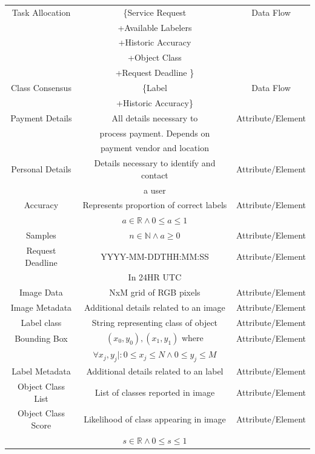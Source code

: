 \documentclass[12pt]{article}
\begin{document}
\begin{center}
  \begin{tabular}{ |c|c|c| } %
    \hline
    Task Allocation &  \{Service Request & Data Flow \\ 
    &  +Available Labelers & \\
    &  +Historic Accuracy & \\
    &  +Object Class & \\
    &  +Request Deadline \} & \\
    \hline
    Class Consensus &  \{Label & Data Flow \\ 
    &  +Historic Accuracy\} & \\
    \hline
    Payment Details & All details necessary to   & Attribute/Element \\ 
    & process payment. Depends on &\\
    & payment vendor and location  &  \\ 
    \hline
    Personal Details & Details necessary to identify and contact & Attribute/Element \\
    &    a user  &  \\
    \hline
    Accuracy & Represents proportion of correct labels & Attribute/Element \\
    & $a \in \mathbb{R} \wedge 0 \leq a \leq 1$ & \\
    \hline
    Samples & $n \in \mathbb{N} \wedge a \geq 0 $ & Attribute/Element \\
    \hline
    Request Deadline & YYYY-MM-DDTHH:MM:SS & Attribute/Element \\
    & In 24HR UTC &  \\
    \hline
    Image Data & NxM grid of RGB pixels & Attribute/Element \\
    \hline
    Image Metadata & Additional details related to an image& Attribute/Element \\
    \hline
    Label class & String representing class of object& Attribute/Element \\
    \hline
    Bounding Box & $(x_0,y_0),(x_1,y_1)$ where  & Attribute/Element \\
    & $\forall x_j,y_j |: 0 \leq x_j \leq N \wedge 0 \leq y_j \leq M $   &  \\
    \hline
    Label Metadata & Additional details related to an label& Attribute/Element \\
    \hline
    Object Class List & List of classes reported in image & Attribute/Element \\
    \hline
    Object Class Score & Likelihood of class appearing in image & Attribute/Element \\
    & $s \in \mathbb{R} \wedge 0 \leq s \leq 1$ &  \\
    \hline

  \end{tabular}

\end{center}
\newpage
\end{document}
